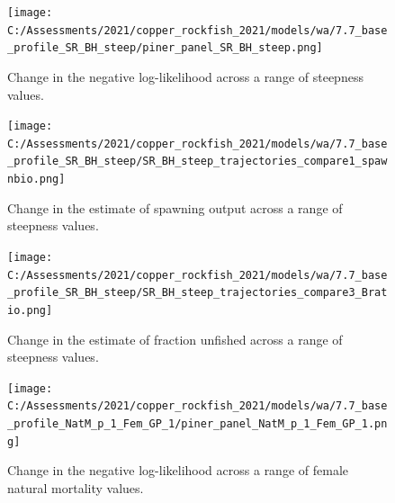 \documentclass[11pt,
  english,
  a4paper,
]{article}
\begin{document}

\begin{figure}
\centering
\texttt{[image: C:/Assessments/2021/copper\_rockfish\_2021/models/wa/7.7\_base\_profile\_SR\_BH\_steep/piner\_panel\_SR\_BH\_steep.png]}
\caption{Change in the negative log-likelihood across a range of steepness values.\label{fig:h-profile}}
\end{figure}

\tagmcend\tagstructend


\begin{figure}
\centering
\texttt{[image: C:/Assessments/2021/copper\_rockfish\_2021/models/wa/7.7\_base\_profile\_SR\_BH\_steep/SR\_BH\_steep\_trajectories\_compare1\_spawnbio.png]}
\caption{Change in the estimate of spawning output across a range of steepness values.\label{fig:h-ssb}}
\end{figure}

\tagmcend\tagstructend


\begin{figure}
\centering
\texttt{[image: C:/Assessments/2021/copper\_rockfish\_2021/models/wa/7.7\_base\_profile\_SR\_BH\_steep/SR\_BH\_steep\_trajectories\_compare3\_Bratio.png]}
\caption{Change in the estimate of fraction unfished across a range of steepness values.\label{fig:h-depl}}
\end{figure}

\tagmcend\tagstructend


\begin{figure}
\centering
\texttt{[image: C:/Assessments/2021/copper\_rockfish\_2021/models/wa/7.7\_base\_profile\_NatM\_p\_1\_Fem\_GP\_1/piner\_panel\_NatM\_p\_1\_Fem\_GP\_1.png]}
\caption{Change in the negative log-likelihood across a range of female natural mortality values.\label{fig:m-profile}}
\end{figure}
\end{document}
